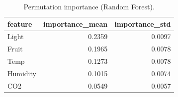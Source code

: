 \begin{table}
\caption{Permutation importance (Random Forest).}
\label{tab:perm}
\begin{tabular}{lrr}
\toprule
feature & importance\_mean & importance\_std \\
\midrule
Light & 0.2359 & 0.0097 \\
Fruit & 0.1965 & 0.0078 \\
Temp & 0.1273 & 0.0078 \\
Humidity & 0.1015 & 0.0074 \\
CO2 & 0.0549 & 0.0057 \\
\bottomrule
\end{tabular}
\end{table}
